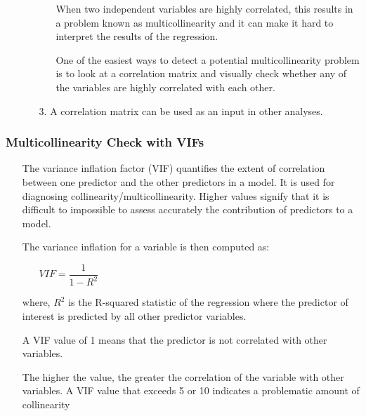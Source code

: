 \documentclass[a4paper]{article}
\begin{document}
\begin{itemize}
\begin{itemize}
\begin{itemize}
            \item[] When two independent variables are highly correlated, this results in a problem known as multicollinearity and it can make it hard to interpret the results of the regression.
            
            \item[] One of the easiest ways to detect a potential multicollinearity problem is to look at a correlation matrix and visually check whether any of the variables are highly correlated with each other.
        \end{itemize}
        \item[3.] A correlation matrix can be used as an input in other analyses.
    \end{itemize}
\end{itemize}
\subsubsection{Multicollinearity Check with VIFs}
\begin{itemize}
    \item[] The variance inflation factor (VIF) quantifies the extent of correlation between one predictor and the other predictors in a model. It is used for diagnosing collinearity/multicollinearity. Higher values signify that it is difficult to impossible to assess accurately the contribution of predictors to a model.
    
    \item[] The variance inflation for a variable is then computed as:
    \begin{itemize}
        \centering
        \large
        \item[] $VIF = \dfrac{1}{1-R^2}$ 
    \end{itemize}
    \item[]where, $R^2$ is the R-squared statistic of the regression where the predictor of interest is predicted by all other predictor variables.
    
    \item[] A VIF value of 1 means that the predictor is not correlated with other variables. 
    
    \item[] The higher the value, the greater the correlation of the variable with other variables. A VIF value that exceeds 5 or 10 indicates a problematic amount of collinearity
\end{itemize}
\end{document}
